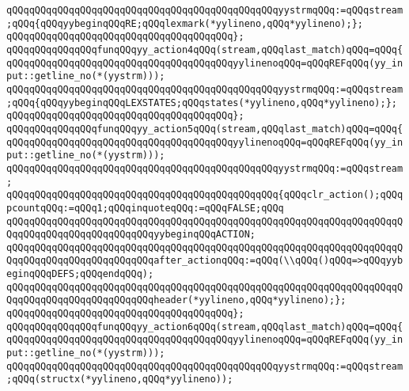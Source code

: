\verb|qQQqqQQqqQQqqQQqqQQqqQQqqQQqqQQqqQQqqQQqqQQqqQQqyystrmqQQq:=qQQqstream;qQQq{qQQqyybeginqQQqRE;qQQqlexmark(*yylineno,qQQq*yylineno);};|\newline
\verb|qQQqqQQqqQQqqQQqqQQqqQQqqQQqqQQqqQQqqQQq};|\newline
\verb|qQQqqQQqqQQqqQQqfunqQQqyy_action4qQQq(stream,qQQqlast_match)qQQq=qQQq{|\newline
\verb|qQQqqQQqqQQqqQQqqQQqqQQqqQQqqQQqqQQqqQQqyylinenoqQQq=qQQqREFqQQq(yy_input::getline_no(*(yystrm)));|\newline
\newline
\verb|qQQqqQQqqQQqqQQqqQQqqQQqqQQqqQQqqQQqqQQqqQQqqQQqyystrmqQQq:=qQQqstream;qQQq{qQQqyybeginqQQqLEXSTATES;qQQqstates(*yylineno,qQQq*yylineno);};|\newline
\verb|qQQqqQQqqQQqqQQqqQQqqQQqqQQqqQQqqQQqqQQq};|\newline
\verb|qQQqqQQqqQQqqQQqfunqQQqyy_action5qQQq(stream,qQQqlast_match)qQQq=qQQq{|\newline
\verb|qQQqqQQqqQQqqQQqqQQqqQQqqQQqqQQqqQQqqQQqyylinenoqQQq=qQQqREFqQQq(yy_input::getline_no(*(yystrm)));|\newline
\newline
\verb|qQQqqQQqqQQqqQQqqQQqqQQqqQQqqQQqqQQqqQQqqQQqqQQqyystrmqQQq:=qQQqstream;|\newline
\verb|qQQqqQQqqQQqqQQqqQQqqQQqqQQqqQQqqQQqqQQqqQQqqQQq{qQQqclr_action();qQQqpcountqQQq:=qQQq1;qQQqinquoteqQQq:=qQQqFALSE;qQQq|\newline
\verb|qQQqqQQqqQQqqQQqqQQqqQQqqQQqqQQqqQQqqQQqqQQqqQQqqQQqqQQqqQQqqQQqqQQqqQQqqQQqqQQqqQQqqQQqqQQqqQQqyybeginqQQqACTION;|\newline
\verb|qQQqqQQqqQQqqQQqqQQqqQQqqQQqqQQqqQQqqQQqqQQqqQQqqQQqqQQqqQQqqQQqqQQqqQQqqQQqqQQqqQQqqQQqqQQqqQQqafter_actionqQQq:=qQQq(\\qQQq()qQQq=>qQQqyybeginqQQqDEFS;qQQqendqQQq);|\newline
\verb|qQQqqQQqqQQqqQQqqQQqqQQqqQQqqQQqqQQqqQQqqQQqqQQqqQQqqQQqqQQqqQQqqQQqqQQqqQQqqQQqqQQqqQQqqQQqqQQqheader(*yylineno,qQQq*yylineno);};|\newline
\verb|qQQqqQQqqQQqqQQqqQQqqQQqqQQqqQQqqQQqqQQq};|\newline
\verb|qQQqqQQqqQQqqQQqfunqQQqyy_action6qQQq(stream,qQQqlast_match)qQQq=qQQq{|\newline
\verb|qQQqqQQqqQQqqQQqqQQqqQQqqQQqqQQqqQQqqQQqyylinenoqQQq=qQQqREFqQQq(yy_input::getline_no(*(yystrm)));|\newline
\newline
\verb|qQQqqQQqqQQqqQQqqQQqqQQqqQQqqQQqqQQqqQQqqQQqqQQqyystrmqQQq:=qQQqstream;qQQq(structx(*yylineno,qQQq*yylineno));|\newline
